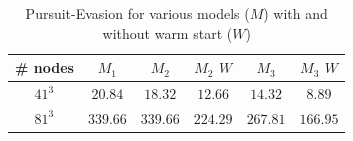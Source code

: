 \begin{table}
\centering
\caption{Pursuit-Evasion for various models ($M$) with and without warm start ($W$)}
\label{tab:pursuit_evasion}
\begin{tabular}{|c| c| c| c| c|c|}
\hline
\# nodes & $M_1$ & $M_2$ & $M_2$  $W$ & $M_3$ & $M_3$  $W$\\ \hline
$41^3$ & $20.84$ & $18.32$ & $12.66$ & $14.32$ & $8.89$ \\ \hline
$81^3$ & $339.66$ & $339.66$ & $224.29$ & $267.81$ & $166.95$ \\ \hline
\end{tabular}
\end{table}